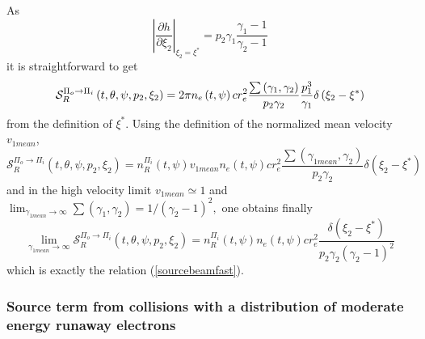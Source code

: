 As 
\begin{equation}
\left\vert \frac{\partial h}{\partial \xi _{2}}\right\vert _{\xi _{2}=\xi
^{\ast }}=p_{2}\gamma _{1}\frac{\gamma _{1}-1}{\gamma _{2}-1}
\end{equation}%
it is straightforward to get 
\begin{equation}
\mathcal{S}_{R}^{\Pi _{o}\rightarrow \Pi _{i}}\left( t,\theta ,\psi
,p_{2},\xi _{2}\right) =2\pi n_{e}\left( t,\psi \right) cr_{e}^{2}\frac{\sum
\left( \gamma _{1},\gamma _{2}\right) }{p_{2}\gamma _{2}}\frac{p_{1}^{3}}{%
\gamma _{1}}\delta \left( \xi _{2}-\xi ^{\ast }\right) 
\end{equation}%
from the definition of $\xi ^{\ast }.$ Using the definition of the
normalized mean velocity $v_{1mean}$, 
\begin{equation}
\mathcal{S}_{R}^{\Pi _{o}\rightarrow \Pi _{i}}\left( t,\theta ,\psi
,p_{2},\xi _{2}\right) =n_{R}^{\Pi _{i}}\left( t,\psi \right)
v_{1mean}n_{e}\left( t,\psi \right) cr_{e}^{2}\frac{\sum \left( \gamma
_{1mean},\gamma _{2}\right) }{p_{2}\gamma _{2}}\delta \left( \xi _{2}-\xi
^{\ast }\right) 
\end{equation}%
and in the high velocity limit $v_{1mean}\simeq 1$ and $\lim_{\gamma
_{1mean}\rightarrow \infty }\sum \left( \gamma _{1},\gamma _{2}\right)
=1/\left( \gamma _{2}-1\right) ^{2},$ one obtains finally 
\begin{equation}
\lim_{\gamma _{1mean}\rightarrow \infty }\mathcal{S}_{R}^{\Pi
_{o}\rightarrow \Pi _{i}}\left( t,\theta ,\psi ,p_{2},\xi _{2}\right)
=n_{R}^{\Pi _{i}}\left( t,\psi \right) n_{e}\left( t,\psi \right) cr_{e}^{2}%
\frac{\delta \left( \xi _{2}-\xi ^{\ast }\right) }{p_{2}\gamma _{2}\left(
\gamma _{2}-1\right) ^{2}}
\end{equation}%
which is exactly the relation (\ref{sourcebeamfast}).

\subsubsection{Source term from collisions with a distribution of moderate
energy runaway electrons}

